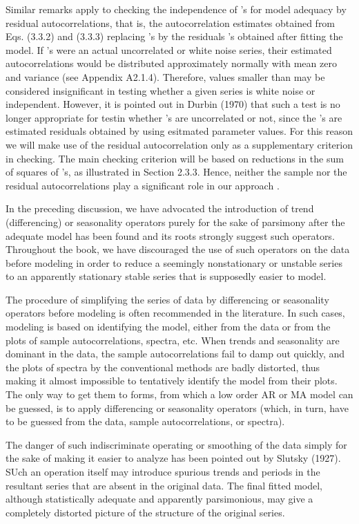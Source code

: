 Similar remarks apply to checking the independence
of 's for model adequacy by residual
autocorrelations, that is, the autocorrelation
estimates obtained from Eqs.  (3.3.2) and (3.3.3)
replacing 's by the residuals 's obtained after
fitting the model.  If 's were an actual
uncorrelated or white noise series, their
estimated autocorrelations would be distributed
approximately normally with mean zero and variance
(see Appendix A2.1.4).  Therefore, values smaller
than may be considered insignificant in testing
whether a given series is white noise or
independent.  However, it is pointed out in Durbin
(1970) that such a test is no longer appropriate
for testin whether 's are uncorrelated or not,
since the 's are estimated residuals obtained by
using esitmated parameter values.  For this reason
we will make use of the residual autocorrelation
only as a supplementary criterion in checking.
The main checking criterion will be based on
reductions in the sum of squares of 's, as
illustrated in Section 2.3.3.  Hence, neither the
sample nor the residual autocorrelations play a
significant role in our approach .
 
In the preceding discussion, we have advocated the
introduction of trend (differencing) or
seasonality operators purely for the sake of
parsimony after the adequate model has been found
and its roots strongly suggest such operators.
Throughout the book, we have discouraged the use
of such operators on the data before modeling in
order to reduce a seemingly nonstationary or
unstable series to an apparently stationary stable
series that is supposedly easier to model.
 
The procedure of simplifying the series of data by
differencing or seasonality operators before
modeling is often recommended in the literature.
In such cases, modeling is based on identifying
the model, either from the data or from the plots
of sample autocorrelations, spectra, etc.  When
trends and seasonality are dominant in the data,
the sample autocorrelations fail to damp out
quickly, and the plots of spectra by the
conventional methods are badly distorted, thus
making it almost impossible to tentatively
identify the model from their plots.  The only way
to get them to forms, from which a low order AR or
MA model can be guessed, is to apply differencing
or seasonality operators (which, in turn, have to
be guessed from the data, sample autocorrelations,
or spectra).
 
The danger of such indiscriminate operating or
smoothing of the data simply for the sake of
making it easier to analyze has been pointed out
by Slutsky (1927).  SUch an operation itself may
introduce spurious trends and periods in the
resultant series that are absent in the original
data.  The final fitted model, although
statistically adequate and apparently
parsimonious, may give a completely distorted
picture of the structure of the original series.
 

